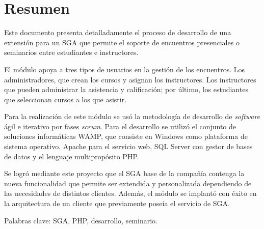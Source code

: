 \chapter*{Resumen}

Este documento presenta detalladamente el proceso de desarrollo de una extensión para un \gls{SGA} que permite el soporte de encuentros presenciales o seminarios entre estudiantes e instructores. 

El módulo apoya a tres tipos de usuarios en la gestión de los encuentros. Los administradores, que crean los cursos y asignan los instructores. Los instructores que pueden administrar la asistencia y calificación; por último, los estudiantes que seleccionan cursos a los que asistir.

Para la realización de este módulo se usó la metodología de desarrollo de \emph{software} ágil e iterativo por fases \emph{scrum}. Para el desarrollo se utilizó el conjunto de soluciones informáticas \gls{WAMP}, que consiste en Windows como plataforma de sistema operativo, Apache para el servicio web, \gls{SQL} Server con gestor de bases de datos y el lenguaje multipropósito PHP.

Se logró mediante este proyecto que el SGA base de la compañía contenga la nueva funcionalidad que permite ser extendida y personalizada dependiendo de las necesidades de distintos clientes. Además, el módulo se implantó con éxito en la arquitectura de un cliente que previamente poseía el servicio de \gls{SGA}.

Palabras clave: \gls{SGA}, \gls{PHP}, desarrollo, seminario.




